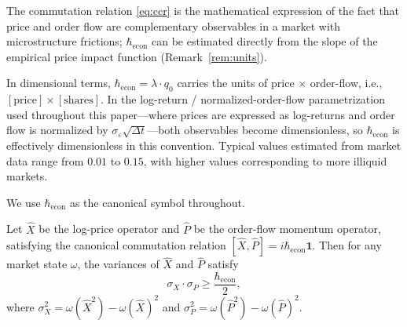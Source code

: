 The commutation relation \eqref{eq:ccr} is the mathematical expression of the fact
that price and order flow are complementary observables in a market with microstructure
frictions; $\hbar_{\mathrm{econ}}$ can be estimated directly from the slope of the
empirical price impact function (Remark~\ref{rem:units}).

\begin{remark}\label{rem:units}
In dimensional terms, $\hbar_{\mathrm{econ}} = \lambda \cdot q_0$ carries the
units of price $\times$ order-flow, i.e., $[\text{price}] \times [\text{shares}]$.
In the log-return / normalized-order-flow parametrization used throughout this
paper---where prices are expressed as log-returns and order flow is normalized by
$\sigma_\varepsilon\sqrt{\Delta t}$---both observables become dimensionless,
so $\hbar_{\mathrm{econ}}$ is effectively dimensionless in this convention.
Typical values estimated from market data range from $0.01$ to $0.15$,
with higher values corresponding to more illiquid markets.
\end{remark}

\begin{remark}[Notation]\label{rem:notation}
We use $\hbar_{\mathrm{econ}}$ as the canonical symbol throughout.
\end{remark}

\begin{theorem}\label{thm:uncertainty}
Let $\hat{X}$ be the log-price operator and $\hat{P}$ be the order-flow momentum
operator, satisfying the canonical commutation relation
$[\hat{X}, \hat{P}] = i\hbar_{\mathrm{econ}} \mathbf{1}$. Then for any market state
$\omega$, the variances of $\hat{X}$ and $\hat{P}$ satisfy
\begin{equation*}
    \sigma_X \cdot \sigma_P \geq \frac{\hbar_{\mathrm{econ}}}{2},
\end{equation*}
where $\sigma_X^2 = \omega(\hat{X}^2) - \omega(\hat{X})^2$ and
$\sigma_P^2 = \omega(\hat{P}^2) - \omega(\hat{P})^2$.
\end{theorem}

